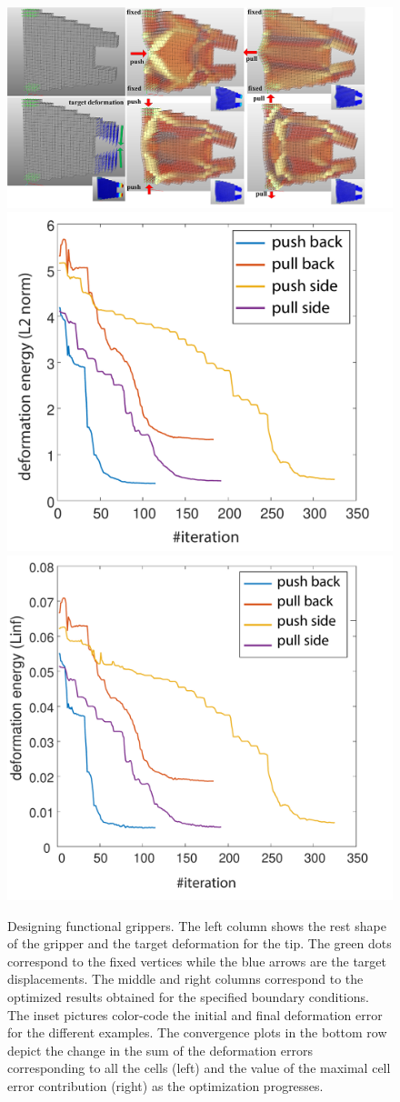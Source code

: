 \begin{figure}[t]
	\centering
	\includegraphics[width=0.9\linewidth]{images/gripperVar.png}
	\includegraphics[width=0.4\linewidth]{images/gripper4_L2.pdf}
	\includegraphics[width=0.4\linewidth]{images/gripper4_Linf.pdf}
	\caption{Designing functional grippers. The left column shows the rest shape of the gripper and the target deformation for the tip.
	The green dots correspond to the fixed vertices while the blue arrows are the target displacements.
	The middle and right columns correspond to the optimized results obtained for the specified boundary conditions.
	The inset pictures color-code the initial and final deformation error for the different examples.
	The convergence plots in the bottom row depict the change in the sum of the deformation errors corresponding to all the cells (left) and the value of the maximal cell error contribution (right) as the optimization progresses.}  
	\label{fig:gripper}
\end{figure}
